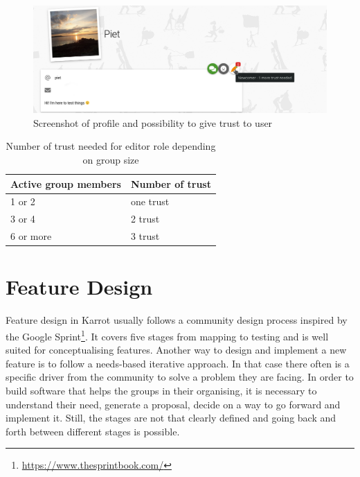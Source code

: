 \documentclass[
	a4paper,%
	11pt,%
	]{article}
\begin{document}
\begin{figure}[ht]
	\includegraphics[width=\textwidth,
	]{images/screenshot_giving-trust-profile.png}
	\caption{Screenshot of profile and possibility to give trust to user}
	\label{fig:screenshot-give-trust}
\end{figure}



\begin{table}[ht]
	\centering
\caption{Number of trust needed for editor role depending on group size}
	\begin{tabular}{ll}
		\toprule
		Active group members & Number of trust\\
		\midrule
		1 or 2  & one trust \\
		3 or 4  & 2 trust \\
		6 or more & 3 trust\\
		\bottomrule
	\end{tabular}
\label{tab:roles_karrot_numbers}
\end{table}	


\section{Feature Design}

Feature design in Karrot usually follows a community design process inspired by the Google Sprint\footnote{\label{url_google_sprint}\url{https://www.thesprintbook.com/}}. It covers five stages from mapping to testing and is well suited for conceptualising features. Another way to design and implement a new feature is to follow a needs-based iterative approach. In that case there often is a specific driver from the community to solve a problem they are facing. In order to build software that helps the groups in their organising, it is necessary to understand their need, generate a proposal, decide on a way to go forward and implement it. Still, the stages are not that clearly defined and going back and forth between different stages is possible.
\end{document}

